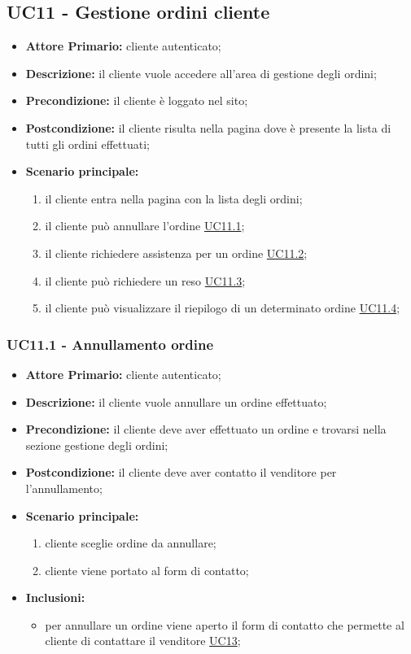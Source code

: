 \subsection{UC11 - Gestione ordini cliente}
\label{UC11}
\begin{itemize}
    \item \textbf{Attore Primario:} cliente autenticato;
    \item \textbf{Descrizione:} il cliente vuole accedere all'area di gestione degli ordini;
    \item \textbf{Precondizione:} il cliente è loggato nel sito;
    \item \textbf{Postcondizione:} il cliente risulta nella pagina dove è presente la lista di tutti gli ordini effettuati;
    \item \textbf{Scenario principale:}
    \begin{enumerate}
        \item il cliente entra nella pagina con la lista degli ordini;
        \item il cliente può annullare l'ordine \hyperref[UC11.1]{UC11.1};
        \item il cliente richiedere assistenza per un ordine \hyperref[UC11.2]{UC11.2};
        \item il cliente può richiedere un reso \hyperref[UC11.3]{UC11.3};
        \item il cliente può visualizzare il riepilogo di un determinato ordine \hyperref[UC11.4]{UC11.4};
    \end{enumerate}
\end{itemize}

\subsubsection{UC11.1 - Annullamento ordine}
\label{UC11.1}
\begin{itemize}
\item \textbf{Attore Primario:} cliente autenticato;
\item \textbf{Descrizione:} il cliente vuole annullare un ordine effettuato;
\item \textbf{Precondizione:} il cliente deve aver effettuato un ordine e trovarsi nella sezione gestione degli ordini;
\item \textbf{Postcondizione:} il cliente deve aver contatto il venditore per l'annullamento;
\item \textbf{Scenario principale:}
\begin{enumerate}
    \item cliente sceglie ordine da annullare;
    \item cliente viene portato al form di contatto;
\end{enumerate}
\item \textbf{Inclusioni:}
\begin{itemize}
    \item per annullare un ordine viene aperto il form di contatto che permette al cliente di contattare il venditore \hyperref[UC13]{UC13};
\end{itemize}
\end{itemize}

